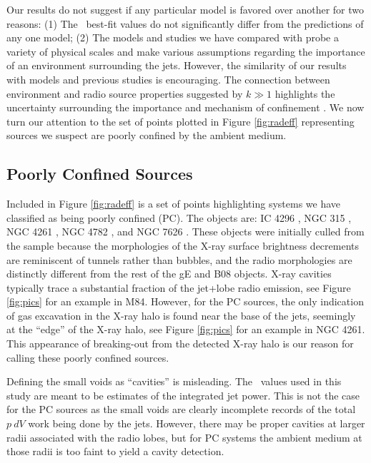 \documentclass{emulateapj}
\begin{document}
Our results do not suggest if any particular model is favored over
another for two reasons: (1) The \bces\ best-fit values do not
significantly differ from the predictions of any one model; (2) The
models and studies we have compared with probe a variety of physical
scales and make various assumptions regarding the importance of an
environment surrounding the jets. However, the similarity of our
results with models and previous studies is encouraging. The
connection between environment and radio source properties suggested
by $k \gg 1$ highlights the uncertainty surrounding the importance and
mechanism of confinement \citep[\eg][]{1973MNRAS.164..243L,
  1977Natur.266..593C, 1987MNRAS.226..531G, 1988ApJ...330...16R,
  1991ApJ...383...56U}. We now turn our attention to the set of points
plotted in Figure \ref{fig:radeff} representing sources we suspect are
poorly confined by the ambient medium.

\subsection{Poorly Confined Sources}
\label{sec:jet}

Included in Figure \ref{fig:radeff} is a set of points highlighting
systems we have classified as being poorly confined (PC). The objects
are: IC 4296 \citep{1988ApJ...324..198K, 2003ApJ...585..677P}, NGC 315
\citep{1979ApJ...228L...9B, 1981A&A....95..250W}, NGC 4261
\citep{1997ApJ...484..186J, 2000ApJ...534..165J}, NGC 4782
\citep{2007ApJ...664..804M}, and NGC 7626 \citep{1985ApJ...291...32B}.
These objects were initially culled from the sample because the
morphologies of the X-ray surface brightness decrements are
reminiscent of tunnels rather than bubbles, and the radio morphologies
are distinctly different from the rest of the gE and B08
objects. X-ray cavities typically trace a substantial fraction of the
jet+lobe radio emission, see Figure \ref{fig:pics} for an example in
M84. However, for the PC sources, the only indication of gas
excavation in the X-ray halo is found near the base of the jets,
seemingly at the ``edge'' of the X-ray halo, see Figure \ref{fig:pics}
for an example in NGC 4261. This appearance of breaking-out from the
detected X-ray halo is our reason for calling these poorly confined
sources.

Defining the small voids as ``cavities'' is misleading. The
\pcav\ values used in this study are meant to be estimates of the
integrated jet power. This is not the case for the PC sources as the
small voids are clearly incomplete records of the total $p~dV$ work
being done by the jets. However, there may be proper cavities at
larger radii associated with the radio lobes, but for PC systems the
ambient medium at those radii is too faint to yield a cavity
detection.
\end{document}

